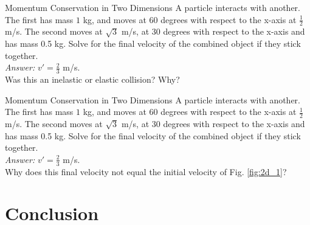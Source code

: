 \documentclass{beamer}
\begin{document}
\begin{frame}{Momentum Conservation in Two Dimensions}
\small
A particle interacts with another.  The first has mass $1$ kg, and moves at 60 degrees with respect to the x-axis at $\frac{1}{2}$ m/s.  The second moves at $\sqrt{3}$ m/s, at 30 degrees with respect to the x-axis and has mass 0.5 kg.  Solve for the final velocity of the combined object if they stick together. \\ \vspace{0.5cm}
\textit{Answer:} $v' = \frac{2}{3}$ m/s. \\ \vspace{0.5cm}
Was this an inelastic or elastic collision?  Why?
\end{frame}

\begin{frame}{Momentum Conservation in Two Dimensions}
\small
A particle interacts with another.  The first has mass $1$ kg, and moves at 60 degrees with respect to the x-axis at $\frac{1}{2}$ m/s.  The second moves at $\sqrt{3}$ m/s, at 30 degrees with respect to the x-axis and has mass 0.5 kg.  Solve for the final velocity of the combined object if they stick together. \\ \vspace{0.5cm}
\textit{Answer:} $v' = \frac{2}{3}$ m/s. \\ \vspace{0.5cm}
Why does this final velocity not equal the initial velocity of Fig. \ref{fig:2d_1}?
\end{frame}

\section{Conclusion}
\end{document}
